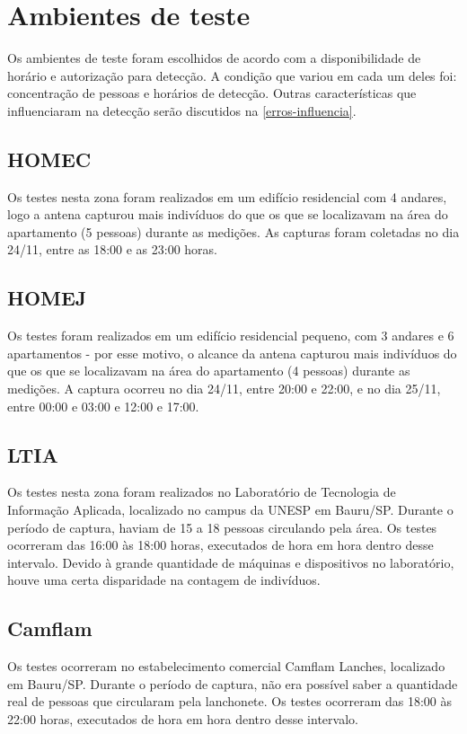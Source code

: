 \section{Ambientes de teste}
Os ambientes de teste foram escolhidos de acordo com a disponibilidade de horário e autorização
para detecção. A condição que variou em cada um deles foi: concentração de pessoas e horários de detecção.
Outras características que influenciaram na detecção serão discutidos na \autoref{erros-influencia}.

\subsection{HOMEC}

Os testes nesta zona foram realizados em um edifício residencial com 4 andares,
logo a antena capturou mais indivíduos do que os que se localizavam na área do
apartamento (5 pessoas) durante as medições. As capturas foram coletadas
no dia 24/11, entre as 18:00 e as 23:00 horas.

\subsection{HOMEJ}
Os testes foram realizados em um edifício residencial pequeno, com 3
andares e 6 apartamentos - por esse motivo, o alcance da antena capturou mais
indivíduos do que os que se localizavam na área do apartamento (4 pessoas)
durante as medições. A captura ocorreu no dia 24/11, entre
20:00 e 22:00, e no dia
25/11, entre 00:00 e 03:00 e 12:00 e 17:00.

\subsection{LTIA}
Os testes nesta zona foram realizados no Laboratório de Tecnologia de Informação
Aplicada, localizado no campus da UNESP em Bauru/SP. Durante o período de
captura, haviam de 15 a 18 pessoas circulando pela área.  Os testes ocorreram
das 16:00 às 18:00 horas, executados de hora em hora dentro desse intervalo.
Devido à grande quantidade de máquinas e dispositivos no laboratório, houve uma
certa disparidade na contagem de indivíduos.

\subsection{Camflam}
Os testes ocorreram no estabelecimento comercial Camflam Lanches, localizado em Bauru/SP. Durante o período de captura, não era possível saber a quantidade real de pessoas que circularam pela lanchonete.  Os testes ocorreram das 18:00 às 22:00 horas, executados de hora em hora dentro desse intervalo.

